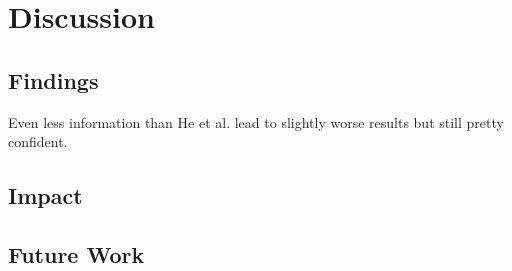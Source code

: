 \chapter{Discussion}

    \section{Findings}
        Even less information than He et al. \cite{DBLP:journals/corr/abs-2005-02131} lead to slightly worse results but still pretty confident.

    \section{Impact}

    \section{Future Work}